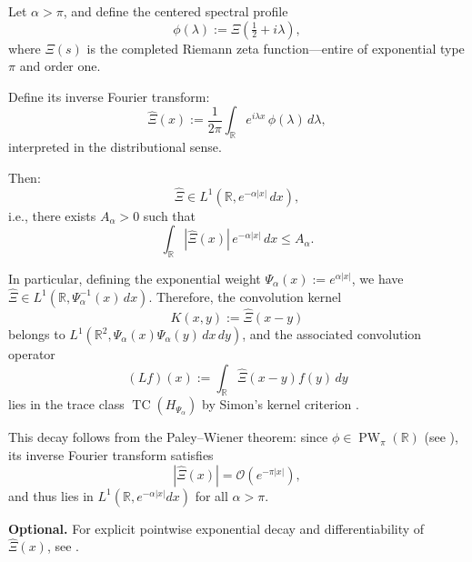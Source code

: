 \begin{lemma}
\label{lem:weighted_L1_inverse_FT_xi}
Let \( \alpha > \pi \), and define the centered spectral profile
\[
\phi(\lambda) := \Xi\left( \tfrac{1}{2} + i\lambda \right),
\]
where \( \Xi(s) \) is the completed Riemann zeta function—entire of exponential type \( \pi \) and order one.

Define its inverse Fourier transform:
\[
\widehat{\Xi}(x) := \frac{1}{2\pi} \int_{\mathbb{R}} e^{i\lambda x} \, \phi(\lambda)\, d\lambda,
\]
interpreted in the distributional sense.

Then:
\[
\widehat{\Xi} \in L^1(\mathbb{R}, e^{-\alpha |x|}\, dx),
\]
i.e., there exists \( A_\alpha > 0 \) such that
\[
\int_{\mathbb{R}} |\widehat{\Xi}(x)| \, e^{-\alpha |x|}\, dx \le A_\alpha.
\]

\medskip
\noindent
In particular, defining the exponential weight \( \Psi_\alpha(x) := e^{\alpha |x|} \), we have \( \widehat{\Xi} \in L^1(\mathbb{R}, \Psi_\alpha^{-1}(x)\, dx) \). Therefore, the convolution kernel
\[
K(x,y) := \widehat{\Xi}(x - y)
\]
belongs to \( L^1(\mathbb{R}^2, \Psi_\alpha(x)\Psi_\alpha(y)\, dx\,dy) \), and the associated convolution operator
\[
(L f)(x) := \int_{\mathbb{R}} \widehat{\Xi}(x - y) f(y)\, dy
\]
lies in the trace class \( \operatorname{TC}(H_{\Psi_\alpha}) \) by Simon’s kernel criterion \cite[Thm.~4.2]{Simon2005TraceIdeals}.

\medskip
\noindent
This decay follows from the Paley--Wiener theorem: since \( \phi \in \operatorname{PW}_\pi(\mathbb{R}) \) (see ), its inverse Fourier transform satisfies
\[
|\widehat{\Xi}(x)| = \mathcal{O}(e^{-\pi |x|}),
\]
and thus lies in \( L^1(\mathbb{R}, e^{-\alpha |x|} dx) \) for all \( \alpha > \pi \).

\medskip
\noindent
\textbf{Optional.} For explicit pointwise exponential decay and differentiability of \( \widehat{\Xi}(x) \), see .
\end{lemma}
